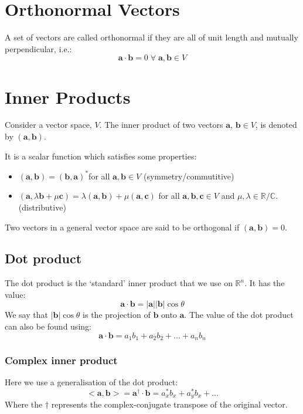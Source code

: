 \section{Orthonormal Vectors}
A set of vectors are called orthonormal if they are all of unit length and
mutually perpendicular, i.e.:
$$
	\bm{a}\cdot\bm{b} = 0 \; \forall \; \bm{a}, \bm{b} \in V
$$

\section{Inner Products}
Consider a vector space, $V$. The inner product of two vectors $\bm{a}$,
$\bm{b} \in V$, is denoted by $(\bm{a}, \bm{b})$.

It is a scalar function which satisfies some properties:
\begin{itemize}
	\item $(\bm{a}, \bm{b}) = {(\bm{b}, \bm{a})}^*$for all $\bm{a}, \bm{b} \in V
	$ (symmetry/commutitive)
	\item $(\bm{a}, \lambda\bm{b} + \mu\bm{c}) = 
	\lambda(\bm{a}, \bm{b}) + \mu(\bm{a}, \bm{c})$ for all $\bm{a}, \bm{b},
	\bm{c} \in V$ and $\mu, \lambda \in \mathbb{R}/\mathbb{C}$. (distributive)
\end{itemize}
Two vectors in a general vector space are said to be orthogonal if $(\bm{a},
\bm{b}) = 0$.

\subsection{Dot product}
The dot product is the `standard' inner product that we use on $\mathbb{R}^n$.
It has the value:
$$
	\bm{a}\cdot\bm{b} = |\bm{a}||\bm{b}|\cos\theta
$$
We say that $|\bm{b}|\cos\theta$ is the projection of $\bm{b}$ onto $\bm{a}$.
The value of the dot product can also be found using:
$$
	\bm{a}\cdot\bm{b} = a_1 b_1 + a_2 b_2 + \hdots + a_n b_n
$$

\subsubsection{Complex inner product}
Here we use a generalisation of the dot product:
$$
	<\bm{a}, \bm{b}> = \bm{a}^\dagger\cdot\bm{b} = a_x^*b_x + a_y^*b_x + \hdots
$$
Where the $\dagger$ represents the complex-conjugate transpose of the original
vector.

